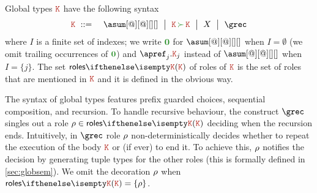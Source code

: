 Global types $\aK$ have the following syntax
\begin{eqnarray*}
  \aK & \bnfdef & \asum[@][@][][]
                  \bnfmid
                  \aK \seqop \aK \bnfmid
                  X \bnfmid
                  \grec
\end{eqnarray*}
where $I$ is a finite set of indexes; we write $\nil$ for
$\asum[@][@][][]$ when $I = \emptyset$ (we omit trailing occurrences
of $\nil$) and $\apref_j.\aK_j$ instead of $\asum[@][@][][]$ when
$I = \{j\}$.
%
The set $\roles \aK$ of roles of $\aK$ is the set of roles that are mentioned in $\aK$ and it is defined in the obvious way.

The syntax of global types features prefix guarded choices, sequential
composition, and recursion.
%
To handle recursive behaviour, 
the construct $\grec$ singles out a role $\arole \in \roles \aK$
%
deciding when the recursion ends.
%
Intuitively, in $\grec$ role  $\rho$ non-deterministically decides whether 
to repeat the execution of  the body $\aK$  or (if ever) to end it.
%
To achieve this,  $\rho$ notifies the decision by generating tuple types for the
other roles (this is formally defined in \cref{sec:globsem}).
%
We omit the decoration $\rho$ when $\roles \aK = \{\arole\}$.

